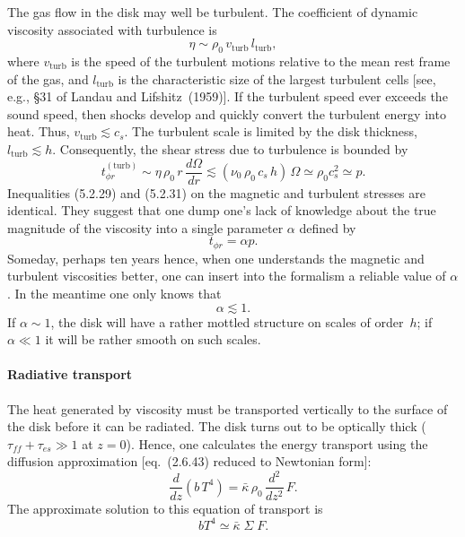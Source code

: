 The gas flow in the disk may well be turbulent. The coefficient of dynamic
viscosity associated with turbulence is
\begin{equation}
\eta \sim \rho_0\, v_{\text{turb}}\, l_{\text{turb}},
\tag{5.2.30}
\end{equation}
where $v_{\text{turb}}$ is the speed of the turbulent motions relative to the mean rest
frame of the gas, and $l_{\text{turb}}$ is the characteristic size of the largest turbulent cells
[see, e.g., \S31 of Landau and Lifshitz~(1959)\cite{LandauLifshitz1959}].
If the turbulent speed ever exceeds
the sound speed, then shocks develop and quickly convert the turbulent energy
into heat. Thus, $v_{\text{turb}} \lesssim c_s$. The turbulent scale is limited by the disk thickness,
$l_{\text{turb}} \lesssim h$. Consequently, the shear stress due to turbulence is bounded by
\begin{equation}
t_{\phi r}^{(\text{turb})} \sim \eta\,\rho_0\,r\,\frac{d\Omega}{dr}
\lesssim (\nu_0\,\rho_0\,c_s\,h)\,\Omega
\simeq \rho_0 c_s^2 \simeq p.
\tag{5.2.31}
\end{equation}
Inequalities (5.2.29) and (5.2.31) on the magnetic and turbulent stresses are
identical. They suggest that one dump one's lack of knowledge about the true
magnitude of the viscosity into a single parameter $\alpha$ defined by
\begin{equation}
t_{\phi r} = \alpha p.
\tag{5.2.32}
\end{equation}
Someday, perhaps ten years hence, when one understands the magnetic and
turbulent viscosities better, one can insert into the formalism a reliable value of
$\alpha$. In the meantime one only knows that
\begin{equation}
\alpha \lesssim 1.
\tag{5.2.33}
\end{equation}
If $\alpha \sim 1$, the disk will have a rather mottled structure on scales of order~$h$; if
$\alpha \ll 1$ it will be rather smooth on such scales.

\paragraph*{Radiative transport}

The heat generated by viscosity must be transported vertically to the surface of
the disk before it can be radiated. The disk turns out to be optically thick
($\tau_{ff}+\tau_{es}\gg 1$ at $z=0$). Hence, one calculates the energy transport using the
diffusion approximation [eq.~(2.6.43) reduced to Newtonian form]:
\begin{equation}
\frac{d}{dz}\!\left(b\,T^4\right) = \bar{\kappa}\,\rho_0\,\frac{d^2}{dz^2}\,F.
\tag{5.2.34}
\end{equation}
The approximate solution to this equation of transport is
\begin{equation}
bT^4 \simeq \bar{\kappa}\;\Sigma\; F.
\tag{5.2.35}
\end{equation}

